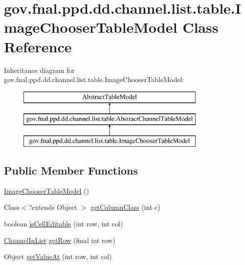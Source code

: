\hypertarget{classgov_1_1fnal_1_1ppd_1_1dd_1_1channel_1_1list_1_1table_1_1ImageChooserTableModel}{\section{gov.\-fnal.\-ppd.\-dd.\-channel.\-list.\-table.\-Image\-Chooser\-Table\-Model Class Reference}
\label{classgov_1_1fnal_1_1ppd_1_1dd_1_1channel_1_1list_1_1table_1_1ImageChooserTableModel}
}
Inheritance diagram for gov.\-fnal.\-ppd.\-dd.\-channel.\-list.\-table.\-Image\-Chooser\-Table\-Model\-:\begin{figure}[H]
\begin{center}
\leavevmode
\includegraphics[height=3.000000cm]{classgov_1_1fnal_1_1ppd_1_1dd_1_1channel_1_1list_1_1table_1_1ImageChooserTableModel}
\end{center}
\end{figure}
\subsection*{Public Member Functions}
\begin{DoxyCompactItemize}
\item 
\hyperlink{classgov_1_1fnal_1_1ppd_1_1dd_1_1channel_1_1list_1_1table_1_1ImageChooserTableModel_afe0aba308507de2be933030226aab492}{Image\-Chooser\-Table\-Model} ()
\item 
Class$<$?extends Object $>$ \hyperlink{classgov_1_1fnal_1_1ppd_1_1dd_1_1channel_1_1list_1_1table_1_1ImageChooserTableModel_a8b7164eb617a21eb497f184c3acd1950}{get\-Column\-Class} (int c)
\item 
boolean \hyperlink{classgov_1_1fnal_1_1ppd_1_1dd_1_1channel_1_1list_1_1table_1_1ImageChooserTableModel_ac9c6c92a598cb666edd2e6bc572a0c72}{is\-Cell\-Editable} (int row, int col)
\item 
\hyperlink{classgov_1_1fnal_1_1ppd_1_1dd_1_1channel_1_1ChannelInList}{Channel\-In\-List} \hyperlink{classgov_1_1fnal_1_1ppd_1_1dd_1_1channel_1_1list_1_1table_1_1ImageChooserTableModel_a00da5535ef51a9e172a596176dfbc48e}{get\-Row} (final int row)
\item 
Object \hyperlink{classgov_1_1fnal_1_1ppd_1_1dd_1_1channel_1_1list_1_1table_1_1ImageChooserTableModel_a4cc66bad16ee719c0162a2497820b0ab}{get\-Value\-At} (int row, int col)
\end{DoxyCompactItemize}
